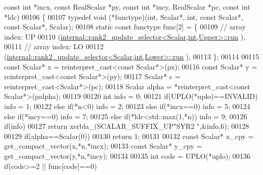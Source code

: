 \begin{DoxyCode}
{      const} \textcolor{keywordtype}{int} *incx, \textcolor{keyword}{const} RealScalar *py, \textcolor{keyword}{const} \textcolor{keywordtype}{int} *incy, RealScalar *pc, \textcolor{keyword}{const} \textcolor{keywordtype}{int} *ldc)
00106 \{
00107   \textcolor{keyword}{typedef} void (*functype)(int, Scalar*, int, \textcolor{keyword}{const} Scalar*, \textcolor{keyword}{const} Scalar*, Scalar);
00108   \textcolor{keyword}{static} \textcolor{keyword}{const} functype func[2] = \{
00109     \textcolor{comment}{// array index: UP}
00110     (\hyperlink{structinternal_1_1rank2__update__selector}{internal::rank2\_update\_selector<Scalar,int,Upper>::run}
      ),
00111     \textcolor{comment}{// array index: LO}
00112     (\hyperlink{structinternal_1_1rank2__update__selector}{internal::rank2\_update\_selector<Scalar,int,Lower>::run}
      ),
00113   \};
00114 
00115   \textcolor{keyword}{const} Scalar* x = \textcolor{keyword}{reinterpret\_cast<}\textcolor{keyword}{const }Scalar*\textcolor{keyword}{>}(px);
00116   \textcolor{keyword}{const} Scalar* y = \textcolor{keyword}{reinterpret\_cast<}\textcolor{keyword}{const }Scalar*\textcolor{keyword}{>}(py);
00117   Scalar* c = \textcolor{keyword}{reinterpret\_cast<}Scalar*\textcolor{keyword}{>}(pc);
00118   Scalar alpha = *\textcolor{keyword}{reinterpret\_cast<}\textcolor{keyword}{const }Scalar*\textcolor{keyword}{>}(palpha);
00119 
00120   \textcolor{keywordtype}{int} info = 0;
00121   \textcolor{keywordflow}{if}(UPLO(*uplo)==INVALID)                                            info = 1;
00122   \textcolor{keywordflow}{else} \textcolor{keywordflow}{if}(*n<0)                                                       info = 2;
00123   \textcolor{keywordflow}{else} \textcolor{keywordflow}{if}(*incx==0)                                                   info = 5;
00124   \textcolor{keywordflow}{else} \textcolor{keywordflow}{if}(*incy==0)                                                   info = 7;
00125   \textcolor{keywordflow}{else} \textcolor{keywordflow}{if}(*ldc<std::max(1,*n))                                        info = 9;
00126   \textcolor{keywordflow}{if}(info)
00127     \textcolor{keywordflow}{return} xerbla\_(SCALAR\_SUFFIX\_UP\textcolor{stringliteral}{"SYR2 "},&info,6);
00128 
00129   \textcolor{keywordflow}{if}(alpha==Scalar(0))
00130     \textcolor{keywordflow}{return} 1;
00131 
00132   \textcolor{keyword}{const} Scalar* x\_cpy = get\_compact\_vector(x,*n,*incx);
00133   \textcolor{keyword}{const} Scalar* y\_cpy = get\_compact\_vector(y,*n,*incy);
00134 
00135   \textcolor{keywordtype}{int} code = UPLO(*uplo);
00136   \textcolor{keywordflow}{if}(code>=2 || func[code]==0)

\end{DoxyCode}
